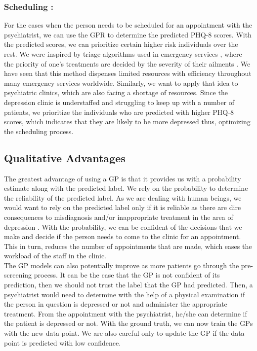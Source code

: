 \documentclass{article}
\begin{document}
	\subsubsection{Scheduling :}
	For the cases when the person needs to be scheduled for an appointment with the psychiatrist, we can use the GPR to determine the predicted PHQ-8 scores. 
    With the predicted scores, we can prioritize certain higher risk individuals over the rest. 
    We were inspired by triage algorithms used in emergency services \cite{shah2015managing,oredsson2011systematic}, where the priority of one's treatments are decided by the severity of their ailments \cite{wiki:Triage}.
    We have seen that this method dispenses limited resources with efficiency \cite{rosedale2011effectiveness} throughout many emergency services worldwide. 
    Similarly, we want to apply that idea to psychiatric clinics, which are also facing a shortage of resources. 
    Since the depression clinic is understaffed and struggling to keep up with a number of patients, we prioritize the individuals who are predicted with higher PHQ-8 scores, which indicates that they are likely to be more depressed thus, optimizing the scheduling process.
    
	\subsection{Qualitative Advantages}
The greatest advantage of using a GP is that it provides us with a probability estimate along with the predicted label. 
    We rely on the probability to determine the reliability of the predicted label. 
    As we are dealing with human beings, we would want to rely on the predicted label only if it is reliable as there are dire consequences to misdiagnosis and/or inappropriate treatment in the area of depression \cite{nasrallah2015consequences,bowden2001strategies,dunner2003clinical}. 
    With the probability, we can be confident of the decisions that we make and decide if the person needs to come to the clinic for an appointment. 
    This in turn, reduces the number of appointments that are made, which eases the workload of the staff in the clinic. \\
    
    The GP models can also potentially improve as more patients go through the pre-screening process.
    It can be the case that the GP is not confident of its prediction, then we should not trust the label that the GP had predicted. 
    Then, a psychiatrist would need to determine with the help of a physical examination if the person in question is depressed or not and administer the appropriate treatment. 
    From the appointment with the psychiatrist, he/she can determine if the patient is depressed or not. 
    With the ground truth, we can now train the GPs with the new data point. 
    We are also careful only to update the GP if the data point is predicted with low confidence. \\
\end{document}

